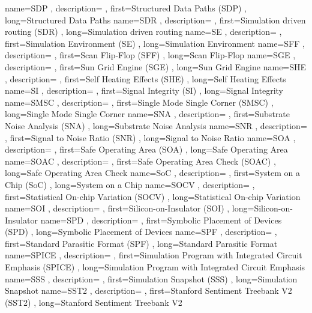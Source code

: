 { name={SDP}
, description={}
, first={Structured Data Paths (SDP)}
, long={Structured Data Paths}
}
{ name={SDR}
, description={}
, first={Simulation driven routing (SDR)}
, long={Simulation driven routing}
}
{ name={SE}
, description={}
, first={Simulation Environment (SE)}
, long={Simulation Environment}
}
{ name={SFF}
, description={}
, first={Scan Flip-Flop (SFF)}
, long={Scan Flip-Flop}
}
{ name={SGE}
, description={}
, first={Sun Grid Engine (SGE)}
, long={Sun Grid Engine}
}
{ name={SHE}
, description={}
, first={Self Heating Effects (SHE)}
, long={Self Heating Effects}
}
{ name={SI}
, description={}
, first={Signal Integrity (SI)}
, long={Signal Integrity}
}
{ name={SMSC}
, description={}
, first={Single Mode Single Corner (SMSC)}
, long={Single Mode Single Corner}
}
{ name={SNA}
, description={}
, first={Substrate Noise Analysis (SNA)}
, long={Substrate Noise Analysis}
}
{ name={SNR}
, description={}
, first={Signal to Noise Ratio (SNR)}
, long={Signal to Noise Ratio}
}
{ name={SOA}
, description={}
, first={Safe Operating Area (SOA)}
, long={Safe Operating Area}
}
{ name={SOAC}
, description={}
, first={Safe Operating Area Check (SOAC)}
, long={Safe Operating Area Check}
}
{ name={SoC}
, description={}
, first={System on a Chip (SoC)}
, long={System on a Chip}
}
{ name={SOCV}
, description={}
, first={Statistical On-chip Variation (SOCV)}
, long={Statistical On-chip Variation}
}
{ name={SOI}
, description={}
, first={Silicon-on-Insulator (SOI)}
, long={Silicon-on-Insulator}
}
{ name={SPD}
, description={}
, first={Symbolic Placement of Devices (SPD)}
, long={Symbolic Placement of Devices}
}
{ name={SPF}
, description={}
, first={Standard Parasitic Format (SPF)}
, long={Standard Parasitic Format}
}
{ name={SPICE}
, description={}
, first={Simulation Program with Integrated Circuit Emphasis (SPICE)}
, long={Simulation Program with Integrated Circuit Emphasis}
}
{ name={SSS}
, description={}
, first={Simulation Snapshot (SSS)}
, long={Simulation Snapshot}
}
{ name={SST2}
, description={}
, first={Stanford Sentiment Treebank V2 (SST2)}
, long={Stanford Sentiment Treebank V2}
}
